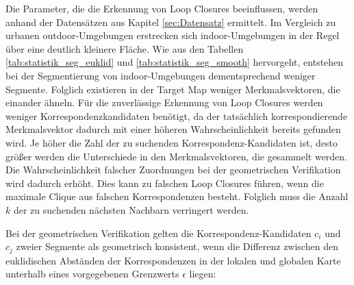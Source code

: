 Die Parameter, die die Erkennung von Loop Closures beeinflussen, werden anhand der Datensätzen aus Kapitel \ref{sec:Datensatz} ermittelt. Im Vergleich zu urbanen outdoor-Umgebungen erstrecken sich indoor-Umgebungen in der Regel über eine deutlich \linebreak kleinere Fläche. Wie aus den Tabellen \ref{tab:statistik_seg_euklid} und \ref{tab:statistik_seg_smooth} hervorgeht, entstehen bei der Segmentierung von indoor-Umgebungen dementsprechend weniger Segmente. Folglich existieren in der Target Map weniger Merkmalsvektoren, die einander ähneln. Für die zuverlässige Erkennung von Loop Closures werden weniger Korrespondenzkandidaten benötigt, da der tatsächlich korrespondierende Merkmalsvektor dadurch mit einer höheren Wahrscheinlichkeit bereits gefunden wird. Je höher die Zahl der zu suchenden Korrespondenz-Kandidaten ist, desto größer werden die Unterschiede in den Merkmalsvektoren, die gesammelt werden. Die Wahrscheinlichkeit falscher Zuordnungen bei der geometrischen Verifikation wird dadurch erhöht. Dies kann zu falschen Loop Closures führen, wenn die maximale Clique aus falschen Korrespondenzen besteht. Folglich muss die Anzahl $k$ der zu suchenden nächsten Nachbarn verringert werden. 


Bei der geometrischen Verifikation gelten die Korrespondenz-Kandidaten $c_i $ und $ c_j $ zweier Segmente als geometrisch konsistent, wenn die Differenz zwischen den euklidischen Abständen der Korrespondenzen in der lokalen und globalen Karte unterhalb eines vorgegebenen Grenzwerts $\epsilon$ liegen:

